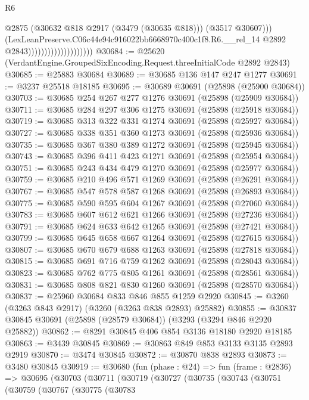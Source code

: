 \begin{lexlean}{R6}
\begin{coremodule}
                                              @2875
                                              (@30632 @818 @2917 (@3479 (@30635 @818)))
                                              (@3517 @30607)))
                                          (LexLeanPreserve.C06c44e94c916022bb6668970c400c1f8.R6.__rel_14
                                            @2892
                                            @2843))))))))))))))))))))
@30684 := @25620 (VerdantEngine.GroupedSixEncoding.Request.threeInitialCode @2892 @2843)
@30685 := @25883 @30684
@30689 := @30685 @136 @147 @247 @1277
@30691 := @3237 @25518 @18185
@30695 := @30689 @30691 (@25898 (@25900 @30684))
@30703 := @30685 @254 @267 @277 @1276 @30691 (@25898 (@25909 @30684))
@30711 := @30685 @284 @297 @306 @1275 @30691 (@25898 (@25918 @30684))
@30719 := @30685 @313 @322 @331 @1274 @30691 (@25898 (@25927 @30684))
@30727 := @30685 @338 @351 @360 @1273 @30691 (@25898 (@25936 @30684))
@30735 := @30685 @367 @380 @389 @1272 @30691 (@25898 (@25945 @30684))
@30743 := @30685 @396 @411 @423 @1271 @30691 (@25898 (@25954 @30684))
@30751 := @30685 @243 @434 @479 @1270 @30691 (@25898 (@25977 @30684))
@30759 := @30685 @210 @496 @571 @1269 @30691 (@25898 (@26291 @30684))
@30767 := @30685 @547 @578 @587 @1268 @30691 (@25898 (@26893 @30684))
@30775 := @30685 @590 @595 @604 @1267 @30691 (@25898 (@27060 @30684))
@30783 := @30685 @607 @612 @621 @1266 @30691 (@25898 (@27236 @30684))
@30791 := @30685 @624 @633 @642 @1265 @30691 (@25898 (@27421 @30684))
@30799 := @30685 @645 @658 @667 @1264 @30691 (@25898 (@27615 @30684))
@30807 := @30685 @670 @679 @688 @1263 @30691 (@25898 (@27818 @30684))
@30815 := @30685 @691 @716 @759 @1262 @30691 (@25898 (@28043 @30684))
@30823 := @30685 @762 @775 @805 @1261 @30691 (@25898 (@28561 @30684))
@30831 := @30685 @808 @821 @830 @1260 @30691 (@25898 (@28570 @30684))
@30837 := @25960 @30684 @833 @846 @855 @1259 @2920
@30845 := @3260 (@3263 @843 @2917) (@3260 (@3263 @838 @2893) @25882)
@30855 := @30837 @30845 @30691 (@25898 (@28579 @30684)) (@3293 (@3294 @846 @2920 @25882))
@30862 := @8291 @30845 @406 @854 @3136 @18180 @2920 @18185
@30863 := @3439 @30845
@30869 := @30863 @849 @853 @3133 @3135 @2893 @2919
@30870 := @3474 @30845
@30872 := @30870 @838 @2893
@30873 := @3480 @30845
@30919 := @30680
    (fun (phase : @24) =>
    fun (frame : @2836) =>
    @30695
      (@30703
        (@30711
          (@30719
            (@30727
              (@30735
                (@30743
                  (@30751
                    (@30759
                      (@30767
                        (@30775
                          (@30783

\end{coremodule}
\end{lexlean}
